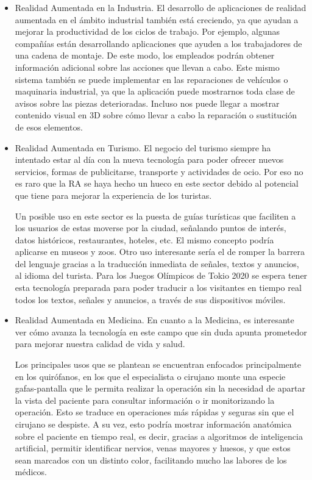 \begin{itemize}
    
    
    \item Realidad Aumentada en la Industria. El desarrollo de aplicaciones de realidad aumentada en el ámbito industrial también está creciendo, ya que ayudan a mejorar la productividad de los ciclos de trabajo. Por ejemplo, algunas compañías están desarrollando aplicaciones que ayuden a los trabajadores de una cadena de montaje. De este modo, los empleados podrán obtener información adicional sobre las acciones que llevan a cabo. Este mismo sistema también se puede implementar en las reparaciones de vehículos o maquinaria industrial, ya que la aplicación puede mostrarnos toda clase de avisos sobre las piezas deterioradas. Incluso nos puede llegar a mostrar contenido visual en 3D sobre cómo llevar a cabo la reparación o sustitución de esos elementos. 
    

    \item Realidad Aumentada en Turismo. El negocio del turismo siempre ha intentado estar al día con la nueva tecnología para poder ofrecer nuevos servicios, formas de publicitarse, transporte y actividades de ocio. Por eso no es raro que la RA se haya hecho un hueco en este sector debido al potencial que tiene para mejorar la experiencia de los turistas. 
    
    Un posible uso en este sector es la puesta de guías turísticas que faciliten a los usuarios de estas moverse por la ciudad, señalando puntos de interés, datos históricos, restaurantes, hoteles, etc. El mismo concepto podría aplicarse en museos y zoos. Otro uso interesante sería el de romper la barrera del lenguaje gracias a la traducción inmediata de señales, textos y anuncios, al idioma del turista. Para los Juegos Olímpicos de Tokio 2020 se espera tener esta tecnología preparada para poder traducir a los visitantes en tiempo real todos los textos, señales y anuncios, a través de sus dispositivos móviles.   

    

    \item Realidad Aumentada en Medicina. En cuanto a la Medicina, es interesante ver cómo avanza la tecnología en este campo que sin duda apunta prometedor para mejorar nuestra calidad de vida y salud.
    
    Los principales usos que se plantean se encuentran enfocados principalmente en los quirófanos, en los que el especialista o cirujano monte una especie gafas-pantalla que le permita realizar la operación sin la necesidad de apartar la vista del paciente para consultar información o ir monitorizando la operación. Esto se traduce en operaciones más rápidas y seguras sin que el cirujano se despiste. A su vez, esto podría mostrar información anatómica sobre el paciente en tiempo real, es decir, gracias a algoritmos de inteligencia artificial, permitir identificar nervios, venas mayores y huesos, y que estos sean marcados con un distinto color, facilitando mucho las labores de los médicos.

\end{itemize}

